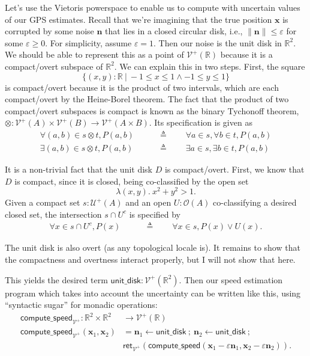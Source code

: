 \documentclass{article}           %
\newcommand{\R}{\mathbb{R}}
\newcommand{\fun}[2]{\lambda {#1}.\  {#2}}
\newcommand{\suchthat}{\ |\ }
\newcommand{\Open}[1]{\mathcal{O}({#1})}
\newcommand{\PUpper}{\mathcal{U}^+}
\newcommand{\Viet}{{\mathcal{V}^+}}
\newcommand{\ret}[1]{\mathsf{ret}_{#1}}
\newcommand{\ve}[1]{\mathbf{#1}}
\newcommand{\then}{\ ;\ }
\newcommand{\defeq}{\triangleq}
\begin{document}
Let's use the Vietoris powerspace to enable us to compute with uncertain values of our GPS estimates. Recall that we're imagining that the true position $\ve{x}$ is corrupted by some noise $\ve{n}$ that lies in a closed circular disk, i.e., $\| \ve{n} \| \le \varepsilon$ for some $\varepsilon \ge 0$. For simplicity, assume $\varepsilon = 1$. Then our noise is the unit disk in $\R^2$. We should be able to represent this as a point of $\Viet(\R)$ because it is a compact/overt subspace of $\R^2$. We can explain this in two steps. First, the square 
\[
\{ (x, y) : \R \suchthat -1 \le x \le 1 \wedge -1 \le y \le 1 \}
\]
is compact/overt because it is the product of two intervals, which are each compact/overt by the Heine-Borel theorem. The fact that the product of two compact/overt subspaces is compact is known as the binary Tychonoff theorem, $\otimes : \Viet(A) \times \Viet(B) \to \Viet(A \times B)$. Its specification is given as
\begin{align*}
\forall (a, b) \in s \otimes t, P(a, b)
\qquad &\defeq \qquad
\forall a \in s, \forall b \in t, P(a, b)
\\
\exists (a, b) \in s \otimes t, P(a, b)
\qquad &\defeq \qquad
\exists a \in s, \exists b \in t, P(a, b)
\end{align*}

It is a non-trivial fact that the unit disk $D$ is compact/overt. First, we know that $D$ is compact, since it is closed, being co-classified by the open set
\[
\fun{(x,y)}{x^2 + y^2 > 1}.
\]
Given a compact set $s : \PUpper(A)$ and an open $U : \Open{A}$ co-classifying a desired closed set, the intersection $s \cap U^c$ is specified by
\begin{align*}
\forall x \in s \cap U^c, P(x) \qquad &\defeq \qquad 
  \forall x \in s, P(x) \vee U(x).
\end{align*}

The unit disk is also overt (as any topological locale is). It remains to show that the compactness and overtness interact properly, but I will not show that here.

This yields the desired term $\mathsf{unit\_disk} : \Viet(\R^2)$. Then our speed estimation program which takes into account the uncertainty can be written like this, using ``syntactic sugar'' for monadic operations:
\begin{align*}
\mathsf{compute\_speed}_\Viet : \R^2 \times \R^2 &\to \Viet(\R)
\\ \mathsf{compute\_speed}_\Viet (\ve{x}_1, \ve{x}_2) &= 
  \ve{n}_1 \leftarrow \mathsf{unit\_disk} 
  \then
  \ve{n}_2 \leftarrow \mathsf{unit\_disk}
  \then
  \\ &\ret{\Viet} \left( \mathsf{compute\_speed}(\ve{x}_1 - \varepsilon \ve{n}_1, \ve{x}_2 - \varepsilon \ve{n}_2) \right).
\end{align*}
\end{document}

